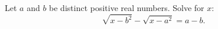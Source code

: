 Let $a$ and $b$ be distinct positive real numbers. Solve for $x$:
\[\sqrt{x-b^2}-\sqrt{x-a^2}=a-b.\]
